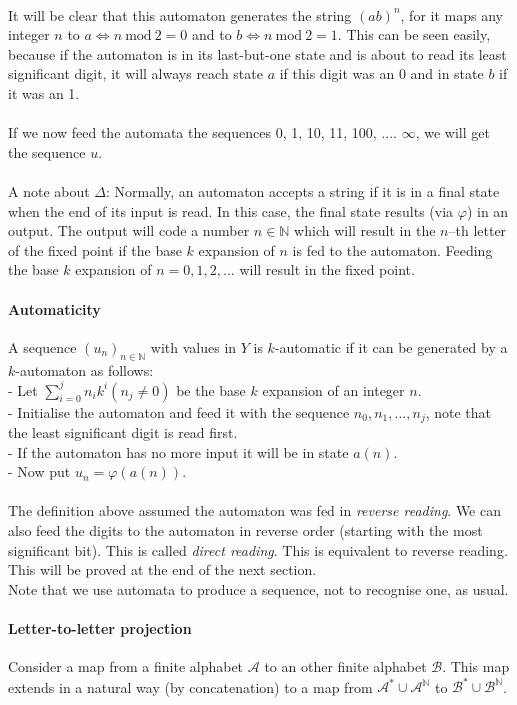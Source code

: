 \documentclass{article}
\begin{document}
\\
It will be clear that this automaton generates the string $(ab)^n$, for it 
maps any integer $n$ to $a \Leftrightarrow n \mathrm{\ mod\ } 2 = 0$ and to 
$b \Leftrightarrow n \mathrm{\ mod\ } 2 = 1$. This can be seen easily, 
because if the automaton is in its last-but-one state and is about to read its 
least significant digit, it will always reach state $a$ if this digit was an 0 
and in state $b$ if it was an 1.\\
\\
If we now feed the automata the sequences 0, 1, 10, 11, 100, .... $\infty$, 
we will get the sequence $u$.\\
\\
A note about $\Delta$: Normally, an automaton accepts a string if it is in
a final state when the end of its input is read. In this case, the final state
results (via $\varphi$) in an output. The output will code a number 
$n \in \mathbb{N}$ which will result in the $n$--th letter of the fixed point
if the base $k$ expansion of $n$ is fed to the automaton. Feeding the base 
$k$ expansion of $n = 0, 1, 2, ...$ will result in the fixed point.

\paragraph{Automaticity} A sequence $(u_n)_{n \in \mathbb{N}}$ with values in
$Y$ is $k$-automatic if it can be generated by a $k$-automaton as follows:\\
- Let $\sum_{i=0}^j n_i k^i (n_j \neq 0)$ be the base $k$ expansion of an
  integer $n$.\\
- Initialise the automaton and feed it with the sequence $n_0, n_1, ..., n_j$,
  note that the least significant digit is read first.\\
- If the automaton has no more input it will be in state $a(n)$.\\
- Now put $u_n = \varphi(a(n))$.\\
\\
The definition above assumed the automaton was fed in \emph{reverse reading}.
We can also feed the digits to the automaton in reverse order (starting with 
the most significant bit). This is called \emph{direct reading}. This is 
equivalent to reverse reading. This will be proved at the end of the next 
section.\\
Note that we use automata to produce a sequence, not to recognise one, as 
usual.

\paragraph{Letter-to-letter projection} Consider a map from a finite alphabet 
$\mathcal{A}$ to an other finite alphabet $\mathcal{B}$. This map extends in 
a natural way (by concatenation) to a map from 
$\mathcal{A}^* \cup \mathcal{A}^\mathbb{N}$ to 
$\mathcal{B}^* \cup \mathcal{B}^\mathbb{N}$.\\
\\
\end{document}

